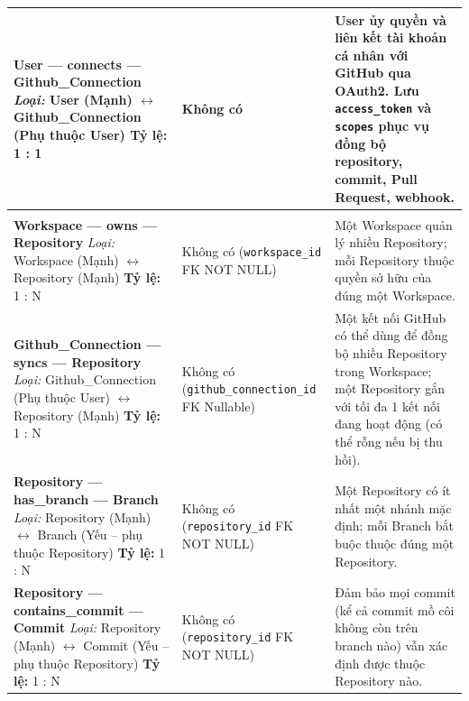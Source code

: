 \begin{longtable}{|
>{\raggedright\arraybackslash}p{}|
>{\raggedright\arraybackslash}p{}|
>{\raggedright\arraybackslash}p{}|}
\textbf{User --- connects --- Github\_Connection}\newline
\textit{Loại:} User (Mạnh) $\leftrightarrow$ Github\_Connection (Phụ thuộc User)\newline
\textbf{Tỷ lệ:} 1 : 1
& 
Không có
& 
User ủy quyền và liên kết tài khoản cá nhân với GitHub qua OAuth2. Lưu \texttt{access\_token} và \texttt{scopes} phục vụ đồng bộ repository, commit, Pull Request, webhook.
\\ \hline

\rowcolor{gray!10}
\multicolumn{3}{|l|}{\textbf{B. Nhóm Mã nguồn \& Cấu trúc Code (VCS \& Code Domain)}} \\
\hline

\textbf{Workspace --- owns --- Repository}\newline
\textit{Loại:} Workspace (Mạnh) $\leftrightarrow$ Repository (Mạnh)\newline
\textbf{Tỷ lệ:} 1 : N
& 
Không có \newline(\texttt{workspace\_id} FK NOT NULL)
& 
Một Workspace quản lý nhiều Repository; mỗi Repository thuộc quyền sở hữu của đúng một Workspace.
\\ \hline

\textbf{Github\_Connection --- syncs --- Repository}\newline
\textit{Loại:} Github\_Connection (Phụ thuộc User) $\leftrightarrow$ Repository (Mạnh)\newline
\textbf{Tỷ lệ:} 1 : N
& 
Không có \newline(\texttt{github\_connection\_id} FK Nullable)
& 
Một kết nối GitHub có thể dùng để đồng bộ nhiều Repository trong Workspace; một Repository gắn với tối đa 1 kết nối đang hoạt động (có thể rỗng nếu bị thu hồi).
\\ \hline

\textbf{Repository --- has\_branch --- Branch}\newline
\textit{Loại:} Repository (Mạnh) $\leftrightarrow$ Branch (Yếu -- phụ thuộc Repository)\newline
\textbf{Tỷ lệ:} 1 : N
& 
Không có \newline(\texttt{repository\_id} FK NOT NULL)
& 
Một Repository có ít nhất một nhánh mặc định; mỗi Branch bắt buộc thuộc đúng một Repository.
\\ \hline

\textbf{Repository --- contains\_commit --- Commit}\newline
\textit{Loại:} Repository (Mạnh) $\leftrightarrow$ Commit (Yếu -- phụ thuộc Repository)\newline
\textbf{Tỷ lệ:} 1 : N
& 
Không có \newline(\texttt{repository\_id} FK NOT NULL)
& 
Đảm bảo mọi commit (kể cả commit mồ côi không còn trên branch nào) vẫn xác định được thuộc Repository nào.
\\ \hline


\end{longtable}
